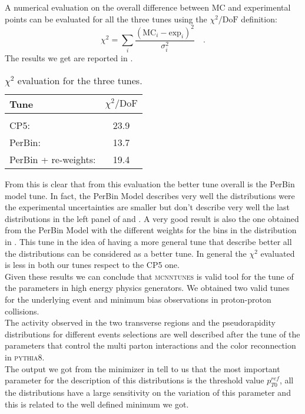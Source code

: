 \medskip

A numerical evaluation on the overall difference between MC and experimental points can be evaluated for all the three tunes using the $\chi^2/\mathrm{DoF}$ definition:
\begin{equation}
	\chi^2=\displaystyle\sum_i\frac{(\text{MC}_i-\text{exp}_i)^2}{\sigma_i^2}\quad.
\end{equation}
The results we get are reported in . 
\begin{table}[!htb]
	\centering
	\begin{tabular}{l  c }
		Tune & $\chi^2/\mathrm{DoF}$\\[2pt]\hline\hline
		\\[-0.85em]
		CP5: & 23.9\\[2pt]
		PerBin: & 13.7\\[2pt]
		PerBin + re-weights: & 19.4\\[2pt]
	\end{tabular}
	\caption{$\chi^2$ evaluation for the three tunes.}
	\label{table:chi2_MinBias}
\end{table}
From this is clear that from this evaluation the better tune overall is the PerBin model tune. In fact, the PerBin Model describes very well the distributions were the experimental uncertainties are smaller but don't describe very well the last distributions in the left panel of  and . A very good result is also the one obtained from the PerBin Model with the different weights for the bins in the distribution in . This tune in the idea of having a more general tune that describe better all the distributions can be considered as a better tune. In general the $\chi^2$ evaluated is less in both our tunes respect to the CP5 one. 
\\
Given these results we can conclude that \textsc{mcnntunes} is valid tool for the tune of the parameters in high energy physics generators. We obtained two valid tunes for the underlying event and minimum bias observations in proton-proton collisions.
\\
The activity observed in the two transverse regions and the pseudorapidity distributions for different events selections are well described after the tune of the parameters that control the multi parton interactions and the color reconnection in \textsc{pythia8}. 
\\
The output we got from the minimizer in  tell to us that the most important parameter for the description of this distributions is the threshold value $p_{T0}^{ref}$, all the distributions have a large sensitivity on the variation of this parameter and this is related to the well defined minimum we got.
